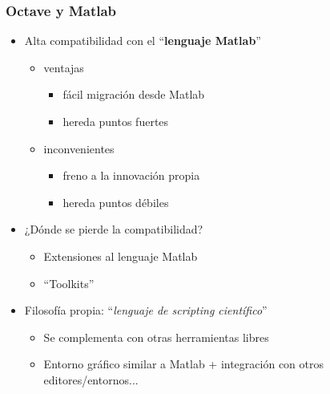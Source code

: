 \hypertarget{octave-y-matlab}{}
\begin{frame}\frametitle{Octave y Matlab}
  \begin{itemize}
  \item 
    Alta compatibilidad con el ``\textbf{lenguaje Matlab}''
    \begin{itemize}
    \item {} ventajas
      \begin{itemize}
      \item fácil migración desde Matlab
      \item hereda puntos fuertes
      \end{itemize}
    \item {} inconvenientes
      \begin{itemize}
      \item freno a la innovación propia
      \item hereda puntos débiles
      \end{itemize}
    \end{itemize}
  
  \item ¿Dónde se pierde la compatibilidad?
    \begin{itemize}
    \item Extensiones al lenguaje Matlab
    \item ``Toolkits''
    \end{itemize}

  \item Filosofía propia: ``\emph{lenguaje de scripting científico}''
    \begin{itemize}
    \item Se complementa con otras herramientas libres
    \item Entorno gráfico similar a Matlab + integración con otros editores/entornos... 
    \end{itemize}

  \end{itemize}
\end{frame}



